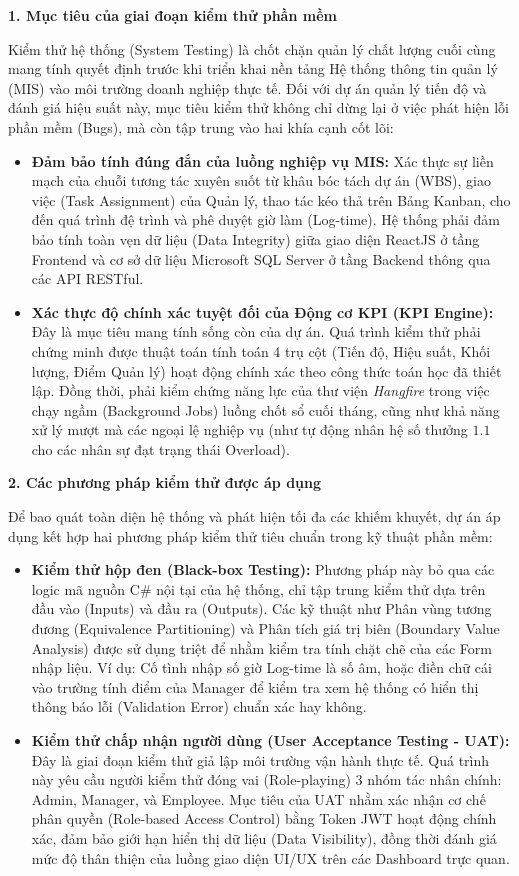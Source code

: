 \documentclass[a4paper,13.5pt]{extreport}
\begin{document}
\textbf{1. Mục tiêu của giai đoạn kiểm thử phần mềm}

Kiểm thử hệ thống (System Testing) là chốt chặn quản lý chất lượng cuối cùng mang tính quyết định trước khi triển khai nền tảng Hệ thống thông tin quản lý (MIS) vào môi trường doanh nghiệp thực tế. Đối với dự án quản lý tiến độ và đánh giá hiệu suất này, mục tiêu kiểm thử không chỉ dừng lại ở việc phát hiện lỗi phần mềm (Bugs), mà còn tập trung vào hai khía cạnh cốt lõi:

\begin{itemize}
    \item \textbf{Đảm bảo tính đúng đắn của luồng nghiệp vụ MIS:} Xác thực sự liền mạch của chuỗi tương tác xuyên suốt từ khâu bóc tách dự án (WBS), giao việc (Task Assignment) của Quản lý, thao tác kéo thả trên Bảng Kanban, cho đến quá trình đệ trình và phê duyệt giờ làm (Log-time). Hệ thống phải đảm bảo tính toàn vẹn dữ liệu (Data Integrity) giữa giao diện ReactJS ở tầng Frontend và cơ sở dữ liệu Microsoft SQL Server ở tầng Backend thông qua các API RESTful.
    \item \textbf{Xác thực độ chính xác tuyệt đối của Động cơ KPI (KPI Engine):} Đây là mục tiêu mang tính sống còn của dự án. Quá trình kiểm thử phải chứng minh được thuật toán tính toán 4 trụ cột (Tiến độ, Hiệu suất, Khối lượng, Điểm Quản lý) hoạt động chính xác theo công thức toán học đã thiết lập. Đồng thời, phải kiểm chứng năng lực của thư viện \textit{Hangfire} trong việc chạy ngầm (Background Jobs) luồng chốt sổ cuối tháng, cũng như khả năng xử lý mượt mà các ngoại lệ nghiệp vụ (như tự động nhân hệ số thưởng $1.1$ cho các nhân sự đạt trạng thái Overload).
\end{itemize}

\textbf{2. Các phương pháp kiểm thử được áp dụng}

Để bao quát toàn diện hệ thống và phát hiện tối đa các khiếm khuyết, dự án áp dụng kết hợp hai phương pháp kiểm thử tiêu chuẩn trong kỹ thuật phần mềm:

\begin{itemize}
    \item \textbf{Kiểm thử hộp đen (Black-box Testing):} Phương pháp này bỏ qua các logic mã nguồn C\# nội tại của hệ thống, chỉ tập trung kiểm thử dựa trên đầu vào (Inputs) và đầu ra (Outputs). Các kỹ thuật như Phân vùng tương đương (Equivalence Partitioning) và Phân tích giá trị biên (Boundary Value Analysis) được sử dụng triệt để nhằm kiểm tra tính chặt chẽ của các Form nhập liệu. Ví dụ: Cố tình nhập số giờ Log-time là số âm, hoặc điền chữ cái vào trường tính điểm của Manager để kiểm tra xem hệ thống có hiển thị thông báo lỗi (Validation Error) chuẩn xác hay không.
    \item \textbf{Kiểm thử chấp nhận người dùng (User Acceptance Testing - UAT):} Đây là giai đoạn kiểm thử giả lập môi trường vận hành thực tế. Quá trình này yêu cầu người kiểm thử đóng vai (Role-playing) 3 nhóm tác nhân chính: Admin, Manager, và Employee. Mục tiêu của UAT nhằm xác nhận cơ chế phân quyền (Role-based Access Control) bằng Token JWT hoạt động chính xác, đảm bảo giới hạn hiển thị dữ liệu (Data Visibility), đồng thời đánh giá mức độ thân thiện của luồng giao diện UI/UX trên các Dashboard trực quan.
\end{itemize}
\end{document}
